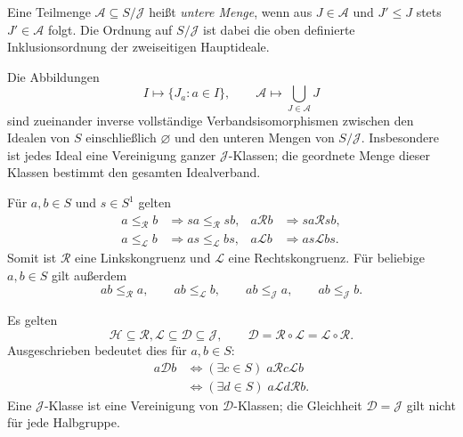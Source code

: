 \begin{definition}
Eine Teilmenge $\mathcal A\subseteq S/\mathcal J$ heißt \emph{untere Menge},
wenn aus $J\in\mathcal A$ und $J'\leq J$ stets $J'\in\mathcal A$ folgt.
Die Ordnung auf $S/\mathcal J$ ist dabei die oben definierte
Inklusionsordnung der zweiseitigen Hauptideale.
\end{definition}

\begin{theorem}
\label{b28guide:thm:ideals-j-order}
Die Abbildungen
\[
 I\longmapsto\{J_a:a\in I\},
 \qquad
 \mathcal A\longmapsto\bigcup_{J\in\mathcal A}J
\]
sind zueinander inverse vollständige Verbandsisomorphismen
zwischen den Idealen von $S$ einschließlich $\varnothing$ und
den unteren Mengen von $S/\mathcal J$.
Insbesondere ist jedes Ideal eine Vereinigung ganzer $\mathcal J$-Klassen;
die geordnete Menge dieser Klassen bestimmt den gesamten Idealverband.
\cite{koussas2021,howie}
\end{theorem}
\begin{theorem}
\label{b28guide:thm:green-compatibility}
Für $a,b\in S$ und $s\in S^1$ gelten
\[
\begin{aligned}
a\leq_{\mathcal R}b&\Longrightarrow sa\leq_{\mathcal R}sb,&
a\mathrel{\mathcal R}b&\Longrightarrow sa\mathrel{\mathcal R}sb,\\
a\leq_{\mathcal L}b&\Longrightarrow as\leq_{\mathcal L}bs,&
a\mathrel{\mathcal L}b&\Longrightarrow as\mathrel{\mathcal L}bs.
\end{aligned}
\]
Somit ist $\mathcal R$ eine Linkskongruenz und $\mathcal L$ eine
Rechtskongruenz. Für beliebige $a,b\in S$ gilt außerdem
\[
ab\leq_{\mathcal R}a,\qquad ab\leq_{\mathcal L}b,
\qquad ab\leq_{\mathcal J}a,\qquad ab\leq_{\mathcal J}b.
\]
\cite{howie}
\end{theorem}

\begin{theorem}
\label{b28guide:thm:green-d}
Es gelten
\[
\mathcal H\subseteq\mathcal R,\mathcal L
\subseteq\mathcal D\subseteq\mathcal J,
\qquad
\mathcal D=\mathcal R\circ\mathcal L
           =\mathcal L\circ\mathcal R.
\]
Ausgeschrieben bedeutet dies für $a,b\in S$:
\[
\begin{aligned}
a\mathrel{\mathcal D}b
&\iff (\exists c\in S)\;
       a\mathrel{\mathcal R}c\mathrel{\mathcal L}b\\
&\iff (\exists d\in S)\;
       a\mathrel{\mathcal L}d\mathrel{\mathcal R}b.
\end{aligned}
\]
Eine $\mathcal J$-Klasse ist eine Vereinigung von $\mathcal D$-Klassen;
die Gleichheit $\mathcal D=\mathcal J$ gilt nicht für jede Halbgruppe.
\cite{howie,green1951}
\end{theorem}

